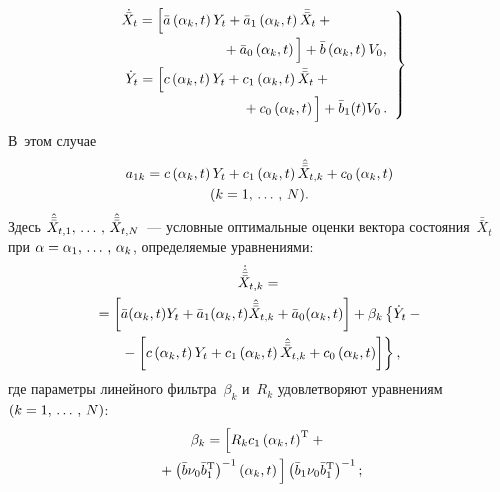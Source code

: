 \begin{multicols}{2}
 \noindent
    \begin{equation}
    \left.
    \begin{array}{l}
    \dot{\bar X}_t = 
    \left[ \bar a\left(\alpha_k,t\right)Y_t + \bar a_1\left(\alpha_k,t\right)\bar{\bar X}_t +{}\right.\\[6pt]
\left.    \hspace*{25mm}{}+ \bar a_0    \left(\alpha_k,t\right)
   \vphantom{\bar{\bar X}_t}
     \right]+   \bar b\left(\alpha_k,t\right)V_0 ,\\[6pt]
    \hspace*{1mm}\dot Y_t= \left[ c\left(\alpha_k,t\right)Y_t+c_1 \left(\alpha_k,t\right)\bar{\bar X}_t +{}\right.\\[6pt]
\left.   \hspace{30mm}{}+ c_0      \left(\alpha_k,t\right)
\vphantom{\bar{\bar X}_t}
\right]  +\bar b_1 (t) V_0\,.
    \end{array}
    \right\}
    \label{e3.16-sin}
\end{equation}
 В~этом случае
\begin{multline*}
a_{1k} = c\left(\alpha_k,t\right)Y_t + c_1 \left(\alpha_k,t\right)\hat{\bar{\bar X}}_{t,k} + c_0 
\left(\alpha_k,t\right)\\ 
    (k=1,\,\ldots\,,\, N).
    \end{multline*}
Здесь $\hat{\bar{\bar X}}_{t,1} ,\,\ldots\,,\, \hat{\bar{\bar X}}_{t,N}$~--- условные оптимальные оценки
вектора состояния~$\bar{\bar X}_t$ при  $\alpha\hm=\alpha_1\tr
\alpha_k$, определяемые уравнениями:
    \begin{multline}
    \dot{\hat{\bar{\bar X}}}_{t,k} = {}\\
    {}= \left[\bar a(\alpha_k,t)Y_t + 
    \bar a_1 (\alpha_k,t)\hat{\bar{\bar X}}_{t,k} +
     \bar a_0 (\alpha_k,t)\right] + \beta_k \left\{ \dot Y_t -{}\right.\\
\left.     {}-\left[ c\left(\alpha_k,t\right)Y_t + 
c_1 \left(\alpha_k,t\right)\hat{\bar{\bar X}}_{t,k} + c_0 \left(\alpha_k,t\right)\right] \right\},
\label{e3.18-sin}
\end{multline}
где параметры линейного
фильт\-ра~$\beta_k$ и~$R_k$ удовле\-тво\-ря\-ют уравнениям      $(k=1,\,\ldots\,,\, N)$:
\begin{multline}
\beta_k = \left[ R_k c_1\left(\alpha_k,t\right)^{\mathrm{T}} + {}\right.\\
\left.{}+\left(\bar b\nu_0\bar b_1^{\mathrm{T}}\right)^{-1} 
\left(\alpha_k,t\right)
\vphantom{\left(\bar b\nu_0\bar b_1^{\mathrm{T}}\right)^{-1}}
\right]
    \left(\bar b_1\nu_0\bar b_1^{\mathrm{T}}\right)^{-1};
\label{e3.19-sin}
    \end{multline}
    

\end{multicols}
